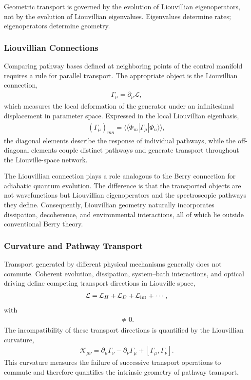 \begin{tcolorbox}[
colback=gray!5,
colframe=black,
title=\textbf{Principle of Pathway Geometry},
fonttitle=\bfseries]
Geometric transport is governed by the evolution of
Liouvillian eigenoperators, not by the evolution of
Liouvillian eigenvalues. Eigenvalues determine rates;
eigenoperators determine geometry.
\end{tcolorbox}

\subsubsection{Liouvillian Connections}
Comparing pathway bases defined at neighboring points of the
control manifold requires a rule for parallel transport. The
appropriate object is the Liouvillian connection,
\begin{align}
\Gamma_\mu
=
\partial_\mu\mathcal L,
\end{align}
which measures the local deformation of the generator under an
infinitesimal displacement in parameter space.
Expressed in the local Liouvillian eigenbasis,
\begin{align}
(\Gamma_\mu)_{mn}
=
\langle\!\langle
\widetilde\Phi_m
|
\Gamma_\mu
|
\Phi_n
\rangle\!\rangle,
\end{align}
the diagonal elements describe the response of individual
pathways, while the off-diagonal elements couple distinct
pathways and generate transport throughout the Liouville-space
network.

The Liouvillian connection plays a role analogous to the Berry
connection for adiabatic quantum evolution. The difference is
that the transported objects are not wavefunctions but
Liouvillian eigenoperators and the spectroscopic pathways they
define. Consequently, Liouvillian geometry naturally incorporates
dissipation, decoherence, and environmental interactions, all of
which lie outside conventional Berry theory.
\subsubsection{Curvature and Pathway Transport}
Transport generated by different physical mechanisms generally
does not commute. Coherent evolution, dissipation,
system--bath interactions, and optical driving define competing
transport directions in Liouville space,
\begin{align}
\mathcal L
=
\mathcal L_H
+
\mathcal L_D
+
\mathcal L_{\rm int}
+\cdots,
\end{align}
with
\begin{align}
[
\mathcal L_\alpha,
\mathcal L_\beta
]
\neq0.
\end{align}
The incompatibility of these transport directions is quantified
by the Liouvillian curvature,
\begin{align}
\mathcal K_{\mu\nu}
=
\partial_\mu\Gamma_\nu
-
\partial_\nu\Gamma_\mu
+
[
\Gamma_\mu,\Gamma_\nu
].
\end{align}
This curvature measures the failure of successive transport
operations to commute and therefore quantifies the intrinsic
geometry of pathway transport.

